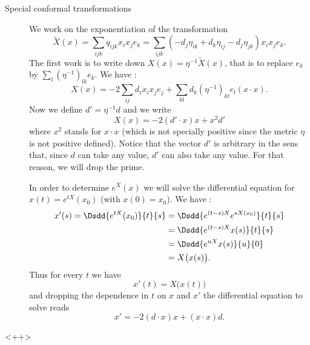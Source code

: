 \begin{description}
\item[Special conformal transformations]

    We work on the exponentiation of the transformation
    \begin{equation}
        \tilde X(x)=\sum_{ijk}q_{ijk}x_ix_je_k=\sum_{ijk}(-d_j\eta_{ik}+d_k\eta_{ij}-d_j\eta_{jk})x_ix_je_k.
    \end{equation}
    The first work is to write down \( X(x)=\eta^{-1}\tilde X(x)\), that is to replace \( e_k\) by \( \sum_l(\eta^{-1})_{lk}e_k\). We have :
    \begin{equation}
        X(x)=-2\sum_{ij}d_ix_ix_je_j+\sum_{kl}d_k(\eta^{-1})_{kl}e_l(x\cdot x).
    \end{equation}
    Now we define \( d'=\eta^{-1}d\) and we write
    \begin{equation}
        X(x)=-2(d'\cdot x)x+x^2d'
    \end{equation}
    where \( x^2\) stands for \( x\cdot x\) (which is not specially positive since the metric \( \eta\) is not positive defined). Notice that the vector \( d'\) is arbitrary in the sens that, since \( d\) can take any value, \( d'\) can also take any value. For that reason, we will drop the prime.

    In order to determine \(  e^{X}(x)\) we will solve the differential equation for \( x(t)= e^{tX}(x_0)\) (with \( x(0)=x_0\)). We have :
    \begin{subequations}
        \begin{align}
            x'(s)=\Dsdd{  e^{tX}(x_0) }{t}{s}&=\Dsdd{  e^{(t-s)X}   e^{sX(x_0)}  }{t}{s}\\
            &=\Dsdd{  e^{(t-s)X}x(s) }{t}{s}\\
            &=\Dsdd{  e^{uX}x(s) }{u}{0}\\
            &=X\big( x(s) \big).
        \end{align}
    \end{subequations}
    Thus for every \( t\) we have
    \begin{equation}
        x'(t)=X\big( x(t) \big)
    \end{equation}
    and dropping the dependence in \( t\) on \( x\) and \( x'\) the differential equation to solve reads
    \begin{equation}
        x'=-2(d\cdot x)x+(x\cdot x)d.
    \end{equation}

\end{description}
<++>

